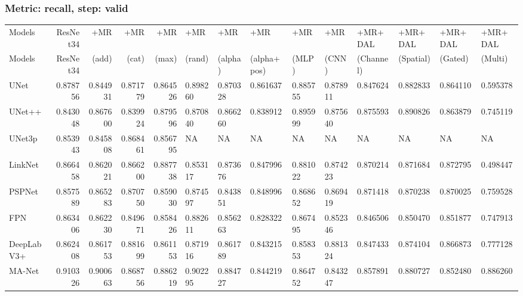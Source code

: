 \documentclass{article}
\begin{document}
\subsubsection{Metric: recall, step: valid}
\begin{tabular}{lrrrrlllllllll}
\toprule
Models & ResNet34 & +MR  & +MR  & +MR  & +MR  & +MR  & +MR  & +MR  & +MR  & +MR+DAL & +MR+DAL & +MR+DAL & +MR+DAL \\
Models & ResNet34 &  (add) &  (cat) &  (max) &  (rand) &  (alpha) &  (alpha+pos) &  (MLP) &  (CNN) & (Channel) & (Spatial) & (Gated) & (Multi) \\
\midrule
UNet & 0.878756 & 0.844931 & 0.871779 & 0.864526 & 0.898260 & 0.870328 & 0.861637 & 0.885755 & 0.878911 & 0.847624 & 0.882833 & 0.864110 & 0.595378 \\
UNet++ & 0.843048 & 0.867600 & 0.839924 & 0.879596 & 0.870840 & 0.866260 & 0.838912 & 0.895999 & 0.875640 & 0.875593 & 0.890826 & 0.863879 & 0.745119 \\
UNet3p & 0.853943 & 0.845808 & 0.868461 & 0.856795 & NA & NA & NA & NA & NA & NA & NA & NA & NA \\
LinkNet & 0.866458 & 0.862021 & 0.866200 & 0.887738 & 0.853117 & 0.873676 & 0.847996 & 0.881022 & 0.874223 & 0.870214 & 0.871684 & 0.872795 & 0.498447 \\
PSPNet & 0.857589 & 0.865283 & 0.870750 & 0.859030 & 0.874597 & 0.843851 & 0.848996 & 0.868652 & 0.869419 & 0.871418 & 0.870238 & 0.870025 & 0.759528 \\
FPN & 0.863406 & 0.862230 & 0.849671 & 0.858426 & 0.882611 & 0.856263 & 0.828322 & 0.867495 & 0.852346 & 0.846506 & 0.850470 & 0.851877 & 0.747913 \\
DeepLabV3+ & 0.862408 & 0.861753 & 0.881699 & 0.861153 & 0.871916 & 0.861789 & 0.843215 & 0.858353 & 0.881324 & 0.847433 & 0.874104 & 0.866873 & 0.777128 \\
MA-Net & 0.910326 & 0.900663 & 0.868756 & 0.886219 & 0.902295 & 0.884727 & 0.844219 & 0.864752 & 0.843247 & 0.857891 & 0.880727 & 0.852480 & 0.886260 \\
\bottomrule
\end{tabular}
\end{document}
